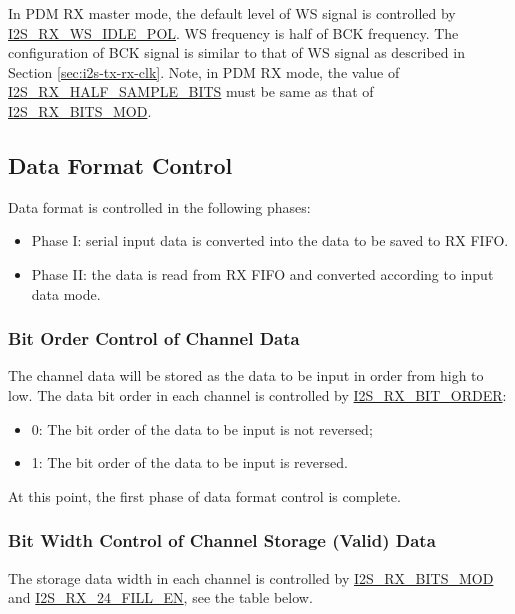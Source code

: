 \documentclass[main\_\_EN.tex]{subfiles}
\begin{document}
In PDM RX master mode, the default level of WS signal is controlled by \hyperref[fielddesc:I2SRXWSIDLEPOL]{I2S\_RX\_WS\_IDLE\_POL}. WS frequency is half of BCK frequency. The configuration of BCK signal is similar to that of WS signal as described in Section \ref{sec:i2s-tx-rx-clk}. Note, in PDM RX mode, the value of \hyperref[fielddesc:I2SRXHALFSAMPLEBITS]{I2S\_RX\_HALF\_SAMPLE\_BITS} must be same as that of \hyperref[fielddesc:I2SRXBITSMOD]{I2S\_RX\_BITS\_MOD}.


\subsection{Data Format Control}
Data format is controlled in the following phases:
\begin{itemize}
    \item Phase I: serial input data is converted into the data to be saved to RX FIFO.
    \item Phase II: the data is read from RX FIFO and converted according to input data mode.
\end{itemize}

\subsubsection{Bit Order Control of Channel Data} 
The channel data will be stored as the data to be input in order from high to low. The data bit order in each channel is controlled by  \hyperref[fielddesc:I2SRXBITORDER]{I2S\_RX\_BIT\_ORDER}:
\begin{itemize}
\item 0: The bit order of the data to be input is not reversed;
\item 1: The bit order of the data to be input is reversed.
\end{itemize}
At this point, the first phase of data format control is complete.

\subsubsection{Bit Width Control of Channel Storage (Valid) Data}
The storage data width in each channel is controlled by \hyperref[fielddesc:I2SRXBITSMOD]{I2S\_RX\_BITS\_MOD} and \hyperref[fielddesc:I2SRX24FILLEN]{I2S\_RX\_24\_FILL\_EN}, see the table below.
\end{document}
